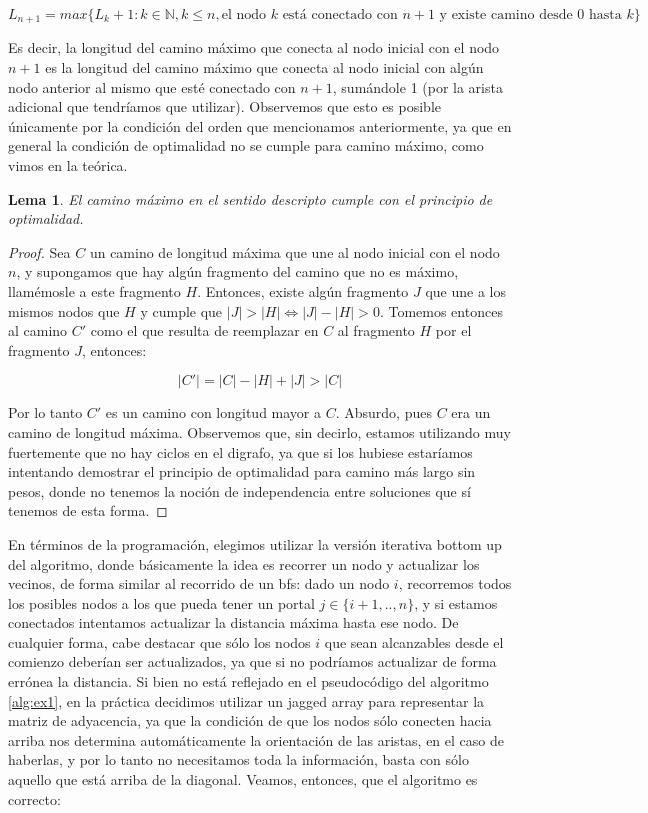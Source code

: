 \documentclass{article}
\newtheorem{lemma}{Lema}[theorem]
\theoremstyle{definition}
\theoremstyle{remark}
\begin{document}
$$L_{n + 1} = max\{L_k + 1 : k \in \mathbb{N}, k \leq n, \text{el nodo } k \text{ está conectado con } n + 1 \text{ y existe camino desde } 0 \text{ hasta } k\}$$

Es decir, la longitud del camino máximo que conecta al nodo inicial con el nodo $n + 1$ es la longitud del camino máximo que conecta al nodo inicial con algún nodo anterior al mismo que esté conectado con $n + 1$, sumándole 1 (por la arista adicional que tendríamos que utilizar). Observemos que esto es posible únicamente por la condición del orden que mencionamos anteriormente, ya que en general la condición de optimalidad no se cumple para camino máximo, como vimos en la teórica.

\begin{lemma}
El camino máximo en el sentido descripto cumple con el principio de optimalidad.
\end{lemma}

\begin{proof}
Sea $C$ un camino de longitud máxima que une al nodo inicial con el nodo $n$, y supongamos que hay algún fragmento del camino que no es máximo, llamémosle a este fragmento $H$. Entonces, existe algún fragmento $J$ que une a los mismos nodos que $H$ y cumple que $|J| > |H| \iff |J| - |H| > 0$. Tomemos entonces al camino $C'$ como el que resulta de reemplazar en $C$ al fragmento $H$ por el fragmento $J$, entonces:

$$|C'| = |C| - |H| + |J| > |C|$$

Por lo tanto $C'$ es un camino con longitud mayor a $C$. Absurdo, pues $C$ era un camino de longitud máxima. Observemos que, sin decirlo, estamos utilizando muy fuertemente que no hay ciclos en el digrafo, ya que si los hubiese estaríamos intentando demostrar el principio de optimalidad para camino más largo sin pesos, donde no tenemos la noción de independencia entre soluciones que sí tenemos de esta forma.
\end{proof}

En términos de la programación, elegimos utilizar la versión iterativa bottom up del algoritmo, donde básicamente la idea es recorrer un nodo y actualizar los vecinos, de forma similar al recorrido de un bfs: dado un nodo $i$, recorremos todos los posibles nodos a los que pueda tener un portal $j \in \{i + 1, .., n\}$, y si estamos conectados intentamos actualizar la distancia máxima hasta ese nodo. De cualquier forma, cabe destacar que sólo los nodos $i$ que sean alcanzables desde el comienzo deberían ser actualizados, ya que si no podríamos actualizar de forma errónea la distancia. Si bien no está reflejado en el pseudocódigo del algoritmo \ref{alg:ex1}, en la práctica decidimos utilizar un jagged array para representar la matriz de adyacencia, ya que la condición de que los nodos sólo conecten hacia arriba nos determina automáticamente la orientación de las aristas, en el caso de haberlas, y por lo tanto no necesitamos toda la información, basta con sólo aquello que está arriba de la diagonal. Veamos, entonces, que el algoritmo es correcto:
\end{document}
